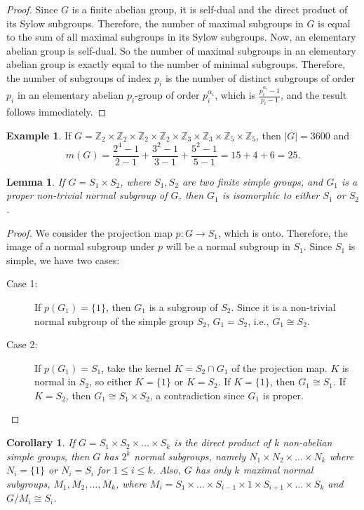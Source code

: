 \documentclass[11pt,a4paper]{article}
\newtheorem{lemma}[theorem]{Lemma}
\newtheorem{corollary}[theorem]{Corollary}
\theoremstyle{definition}
\newtheorem{example}[theorem]{Example}
\begin{document}
\begin{proof}
Since $G$ is a finite abelian group, it is self-dual and the direct product of its Sylow subgroups. Therefore, the number of maximal subgroups in $G$ is equal to the sum of all maximal subgroups in its Sylow subgroups. Now, an elementary abelian group is self-dual. So the number of maximal subgroups in an elementary abelian group is exactly equal to the number of minimal subgroups. Therefore, the number of subgroups of index $p_i$ is the number of distinct subgroups of order $p_i$ in an elementary abelian $p_i$-group of order $p_i^{\alpha_i}$, which is $\frac{p_i^{\alpha_i} - 1}{p_i - 1}$, and the result follows immediately.
\end{proof}

\begin{example}
If $G = \mathbb{Z}_2 \times \mathbb{Z}_2 \times \mathbb{Z}_2 \times \mathbb{Z}_2 \times \mathbb{Z}_3 \times \mathbb{Z}_3 \times \mathbb{Z}_5 \times \mathbb{Z}_5$, then $|G| = 3600$ and
\[
m(G) = \frac{2^4 - 1}{2 - 1} + \frac{3^2 - 1}{3 - 1} + \frac{5^2 - 1}{5 - 1} = 15 + 4 + 6 = 25.
\]
\end{example}

\begin{lemma}\label{lem2.7}
If $G = S_1 \times S_2$, where $S_1, S_2$ are two finite simple groups, and $G_1$ is a proper non-trivial normal subgroup of $G$, then $G_1$ is isomorphic to either $S_1$ or $S_2$.
\end{lemma}

\begin{proof}
We consider the projection map $p : G \to S_1$, which is onto. Therefore, the image of a normal subgroup under $p$ will be a normal subgroup in $S_1$. Since $S_1$ is simple, we have two cases:
\begin{description}
\item[Case 1:] If $p(G_1) = \{1\}$, then $G_1$ is a subgroup of $S_2$. Since it is a non-trivial normal subgroup of the simple group $S_2$, $G_1 = S_2$, i.e., $G_1 \cong S_2$.
\item[Case 2:] If $p(G_1) = S_1$, take the kernel $K = S_2 \cap G_1$ of the projection map. $K$ is normal in $S_2$, so either $K = \{1\}$ or $K = S_2$. If $K = \{1\}$, then $G_1 \cong S_1$. If $K = S_2$, then $G_1 \cong S_1 \times S_2$, a contradiction since $G_1$ is proper.
\end{description}
\end{proof}

\begin{corollary}\label{cor2.8}
If $G = S_1 \times S_2 \times \dots \times S_k$ is the direct product of $k$ non-abelian simple groups, then $G$ has $2^k$ normal subgroups, namely $N_1 \times N_2 \times \dots \times N_k$ where $N_i = \{1\}$ or $N_i = S_i$ for $1 \le i \le k$. Also, $G$ has only $k$ maximal normal subgroups, $M_1, M_2, \dots, M_k$, where $M_i = S_1 \times \dots \times S_{i-1} \times 1 \times S_{i+1} \times \dots \times S_k$ and $G/M_i \cong S_i$.
\end{corollary}
\end{document}
